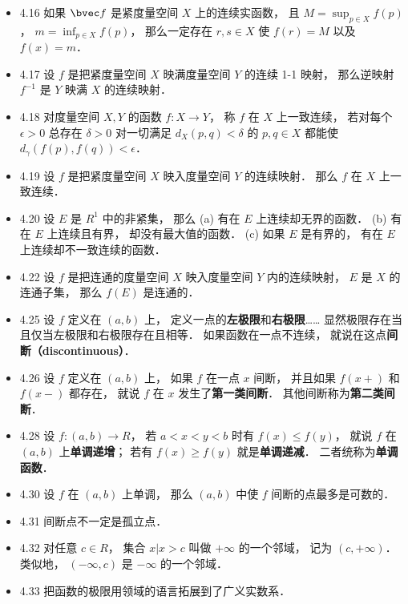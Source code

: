 \begin{itemize}
\item 4.16 如果 $\bvec f$ 是紧度量空间 $X$ 上的连续实函数， 且 $M = \sup_{p\in X} f(p)$， $m=\inf_{p\in X} f(p)$， 那么一定存在 $r,s\in X$ 使 $f(r)=M$ 以及 $f(x)=m$．

\item 4.17 设 $f$ 是把紧度量空间 $X$ 映满度量空间 $Y$ 的连续 1-1 映射， 那么逆映射 $f^{-1}$ 是 $Y$ 映满 $X$ 的连续映射．

\item 4.18 对度量空间 $X,Y$ 的函数 $f:X\to Y$， 称 $f$ 在 $X$ 上一致连续， 若对每个 $\epsilon>0$ 总存在 $\delta >0$ 对一切满足 $d_X(p,q)<\delta$ 的 $p,q\in X$ 都能使 $d_\gamma(f(p),f(q))<\epsilon$．

\item 4.19 设 $f$ 是把紧度量空间 $X$ 映入度量空间 $Y$ 的连续映射． 那么 $f$ 在 $X$ 上一致连续．

\item 4.20 设 $E$ 是 $R^1$ 中的非紧集， 那么 (a) 有在 $E$ 上连续却无界的函数． (b) 有在 $E$ 上连续且有界， 却没有最大值的函数． (c) 如果 $E$ 是有界的， 有在 $E$ 上连续却不一致连续的函数．

\item 4.22 设 $f$ 是把连通的度量空间 $X$ 映入度量空间 $Y$ 内的连续映射， $E$ 是 $X$ 的连通子集， 那么 $f(E)$ 是连通的．

\item 4.25 设 $f$ 定义在 $(a,b)$ 上， 定义一点的\textbf{左极限}和\textbf{右极限}…… 显然极限存在当且仅当左极限和右极限存在且相等． 如果函数在一点不连续， 就说在这点\textbf{间断（discontinuous）}．

\item 4.26 设 $f$ 定义在 $(a,b)$ 上， 如果 $f$ 在一点 $x$ 间断， 并且如果 $f(x+)$ 和 $f(x-)$ 都存在， 就说 $f$ 在 $x$ 发生了\textbf{第一类间断}． 其他间断称为\textbf{第二类间断}．

\item 4.28 设 $f:(a,b)\to R$， 若 $a<x<y<b$ 时有 $f(x)\leqslant f(y)$， 就说 $f$ 在 $(a,b)$ 上\textbf{单调递增}； 若有 $f(x)\geqslant f(y)$ 就是\textbf{单调递减}． 二者统称为\textbf{单调函数}．

\item 4.30 设 $f$ 在 $(a,b)$ 上单调， 那么 $(a,b)$ 中使 $f$ 间断的点最多是可数的．

\item 4.31 间断点不一定是孤立点． 

\item 4.32 对任意 $c\in R$， 集合 ${x|x>c}$ 叫做 $+\infty$ 的一个邻域， 记为 $(c,+\infty)$． 类似地， $(-\infty, c)$ 是 $-\infty$ 的一个邻域．

\item 4.33 把函数的极限用领域的语言拓展到了广义实数系．
\end{itemize}

